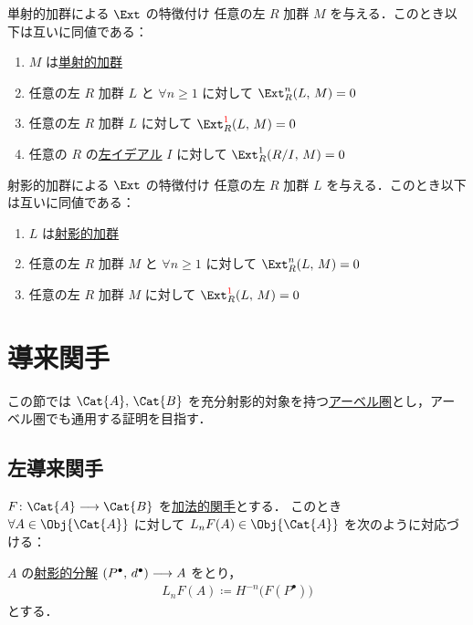 \documentclass[algtopo_main]{subfiles}
\begin{document}
\begin{myprop}[label=prop:Ext-inj-1]{単射的加群による $\Ext$ の特徴付け}
    任意の左 $R$ 加群 $M$ を与える．このとき以下は互いに同値である：
    \begin{enumerate}
        \item $M$ は\hyperref[def:inj-mod]{単射的加群}
        \item 任意の左 $R$ 加群 $L$ と $\forall n \ge 1$ に対して $\Ext^n_R(L,\, M) = 0$
        \item 任意の左 $R$ 加群 $L$ に対して $\Ext_R^{\textcolor{red}{1}}(L,\, M) = 0$
        \item 任意の $R$ の\hyperref[def:ideal]{左イデアル} $I$ に対して $\Ext_R^1(R/I,\, M) = 0$
    \end{enumerate}
\end{myprop}


\begin{myprop}[label=prop:Ext-proj-1]{射影的加群による $\Ext$ の特徴付け}
    任意の左 $R$ 加群 $L$ を与える．このとき以下は互いに同値である：
    \begin{enumerate}
        \item $L$ は\hyperref[def:proj-mod]{射影的加群}
        \item 任意の左 $R$ 加群 $M$ と $\forall n \ge 1$ に対して $\Ext^n_R(L,\, M) = 0$
        \item 任意の左 $R$ 加群 $M$ に対して $\Ext_R^{\textcolor{red}{1}}(L,\, M) = 0$
    \end{enumerate}
\end{myprop}


\section{導来関手}

この節では $\Cat{A},\, \Cat{B}$ を充分射影的対象を持つ\hyperref[def:Abel]{アーベル圏}とし，アーベル圏でも通用する証明を目指す．

\subsection{左導来関手}

\begin{mydef}[label=def:LDF]{}
    $F \colon \Cat{A} \lto \Cat{B}$ を\hyperref[def:Ab-func]{加法的関手}とする．
    このとき $\forall A \in \Obj{\Cat{A}}$ に対して $L_n F(A) \in \Obj{\Cat{A}}$ を次のように対応づける：

    $A$ の\hyperref[def:projective-resolution]{射影的分解} $(P^\bullet,\, d^\bullet) \longrightarrow A$ をとり，
    \begin{align}
        L_n F(A) \coloneqq H^{-n} \bigl( F(P^\bullet) \bigr) 
    \end{align}
    とする．
\end{mydef}
\end{document}
